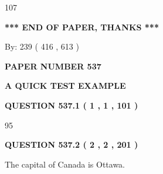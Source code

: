 \documentclass[12pt]{article}
\begin{document}
107
 
 
   
   
 \vspace{0.2in}
 
   
   
   
   
\vspace{1.0in} 
{\textbf{\large{ *** END OF PAPER, THANKS *** }}} 
   
   
\hspace{1.0in} By: 
 239 ( 416 ,  613 )
   
   
   
   
\newpage 
\setcounter{page}{ 
   537001 } 
   
   
   
   
 {\textbf{ \Large{ PAPER NUMBER  537  }}}
   
   
\vspace{0.2in}
   
   
   
   
   
   
 \vspace{0.2in}
{\LARGE {\textbf{ A QUICK TEST EXAMPLE}}}
   
   
  
\vspace{0.2in}
  
{\textbf{\Large{QUESTION
537.1 
 ( 1 , 1 , 101 )
}}}
  
  
 
 
\noindent{}

95
 
 
  
\vspace{0.2in}
  
{\textbf{\Large{QUESTION
537.2 
 ( 2 , 2 , 201 )
}}}
  
  
 
 
\noindent{}
 
 
The capital of Canada is Ottawa.
 
 
 
 
   
   
 \vspace{0.2in}
 
   
   
   
   
\end{document}
